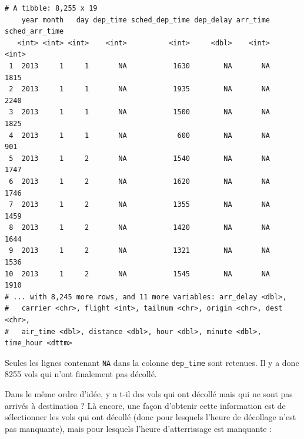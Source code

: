 \documentclass[a4paperpaper,]{article}
\newenvironment{Shaded}{\begin{snugshade}}{\end{snugshade}}
\newcommand{\KeywordTok}[1]{\textcolor[rgb]{0.13,0.29,0.53}{\textbf{#1}}}
\newcommand{\StringTok}[1]{\textcolor[rgb]{0.31,0.60,0.02}{#1}}
\newcommand{\OperatorTok}[1]{\textcolor[rgb]{0.81,0.36,0.00}{\textbf{#1}}}
\newcommand{\NormalTok}[1]{#1}
\theoremstyle{definition}
\theoremstyle{definition}
\theoremstyle{definition}
\theoremstyle{remark}
\begin{document}
\begin{verbatim}
# A tibble: 8,255 x 19
    year month   day dep_time sched_dep_time dep_delay arr_time sched_arr_time
   <int> <int> <int>    <int>          <int>     <dbl>    <int>          <int>
 1  2013     1     1       NA           1630        NA       NA           1815
 2  2013     1     1       NA           1935        NA       NA           2240
 3  2013     1     1       NA           1500        NA       NA           1825
 4  2013     1     1       NA            600        NA       NA            901
 5  2013     1     2       NA           1540        NA       NA           1747
 6  2013     1     2       NA           1620        NA       NA           1746
 7  2013     1     2       NA           1355        NA       NA           1459
 8  2013     1     2       NA           1420        NA       NA           1644
 9  2013     1     2       NA           1321        NA       NA           1536
10  2013     1     2       NA           1545        NA       NA           1910
# ... with 8,245 more rows, and 11 more variables: arr_delay <dbl>,
#   carrier <chr>, flight <int>, tailnum <chr>, origin <chr>, dest <chr>,
#   air_time <dbl>, distance <dbl>, hour <dbl>, minute <dbl>, time_hour <dttm>
\end{verbatim}

Seules les lignes contenant \texttt{NA} dans la colonne
\texttt{dep\_time} sont retenues. Il y a donc 8255 vols qui n'ont
finalement pas décollé.

Dans le même ordre d'idée, y a t-il des vols qui ont décollé mais qui ne
sont pas arrivés à destination ? Là encore, une façon d'obtenir cette
information est de sélectionner les vols qui ont décollé (donc pour
lesquels l'heure de décollage n'est pas manquante), mais pour lesquels
l'heure d'atterrissage est manquante :

\begin{Shaded}
\end{Shaded}
\end{document}
